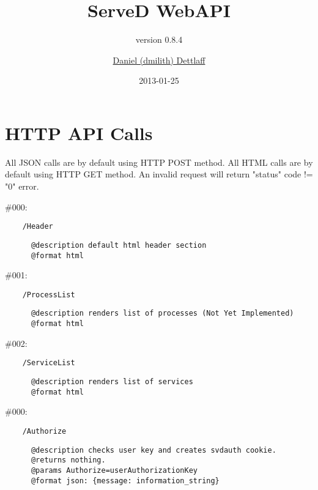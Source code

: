 \documentclass[11pt]{scrartcl}
\title{ServeD WebAPI}
\author{\href{mailto:dmilith@verknowsys.com}{Daniel (dmilith) Dettlaff}}
\subtitle{version 0.8.4}
\date{2013-01-25}
\begin{document}
\maketitle

\section{HTTP API Calls}\label{sec:apicalls}
  All JSON calls are by default using HTTP POST method.
  All HTML calls are by default using HTTP GET method.
  An invalid request will return "status" code != "0" error.

\begin{description}

  \item[GET API calls]

    \item \#000:
      \begin{verbatim}
    /Header
      \end{verbatim}
      \begin{verbatim}
      @description default html header section
      @format html
      \end{verbatim}

    \item \#001:
      \begin{verbatim}
    /ProcessList
      \end{verbatim}
      \begin{verbatim}
      @description renders list of processes (Not Yet Implemented)
      @format html
      \end{verbatim}

    \item \#002:
      \begin{verbatim}
    /ServiceList
      \end{verbatim}
      \begin{verbatim}
      @description renders list of services
      @format html
      \end{verbatim}




  \item[POST API calls]

    \item \#000:
      \begin{verbatim}
    /Authorize
      \end{verbatim}
      \begin{verbatim}
      @description checks user key and creates svdauth cookie.
      @returns nothing.
      @params Authorize=userAuthorizationKey
      @format json: {message: information_string}
      \end{verbatim}


\end{description}
\end{document}
